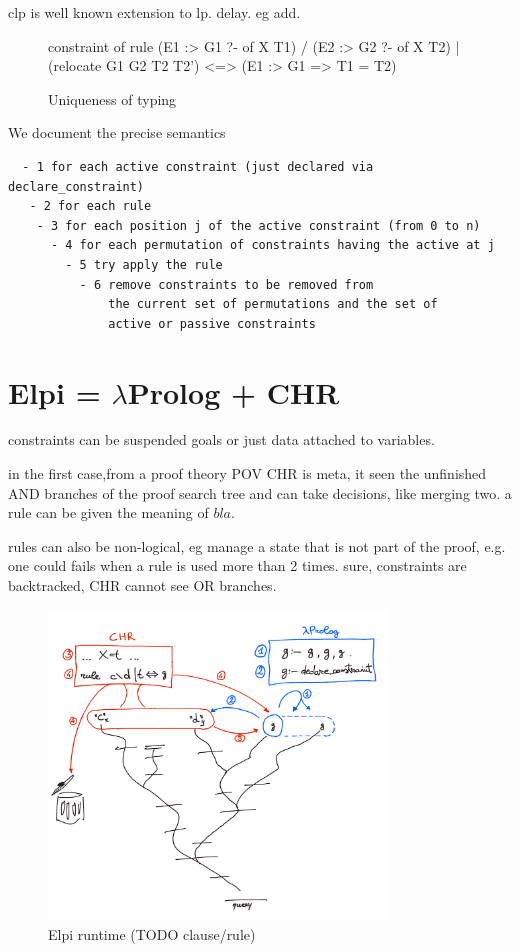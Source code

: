 \documentclass[a4paper, 11pt]{book}
\begin{document}
clp is well known extension to lp. delay. eg add.

\cite{chr}
\cite{10.1007/978-3-540-27775-0_7}


\begin{figure}
\begin{elpicode}
constraint of {
  rule (E1 :> G1 ?- of X T1) / (E2 :> G2 ?- of X T2)
    | (relocate G1 G2 T2 T2')
    <=> (E1 :> G1 => T1 = T2)
}
\end{elpicode}
\caption[UT]{Uniqueness of typing}
\end{figure}

We document the precise semantics

\begin{verbatim}
  - 1 for each active constraint (just declared via declare_constraint)
   - 2 for each rule
    - 3 for each position j of the active constraint (from 0 to n)
      - 4 for each permutation of constraints having the active at j
        - 5 try apply the rule
          - 6 remove constraints to be removed from
              the current set of permutations and the set of
              active or passive constraints
\end{verbatim}

\section{Elpi = $\lambda$Prolog + CHR}



constraints can be suspended goals or just data attached to variables.

in the first case,from a proof theory POV CHR is meta, it seen the unfinished AND
branches of the proof search tree and can take decisions, like merging two. a rule can
be given the meaning of $bla$. 

rules can also be non-logical, eg manage a state that is not part of 
the proof, e.g. one could fails when a rule is used more than 2 times.
sure, constraints are backtracked, CHR cannot see OR branches.

\begin{figure}
  \includegraphics[width=0.8\textwidth]{chr.png}
  \caption{\label{chr:fig}Elpi runtime (TODO clause/rule)}
\end{figure}
 
\end{document}
